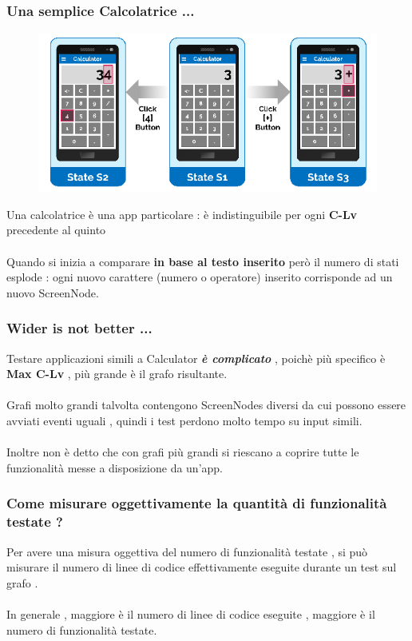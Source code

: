 \documentclass[12pt]{beamer}
\begin{document}

\begin{frame}

\frametitle{Una semplice Calcolatrice ...}
\begin{figure}
\includegraphics[width=0.8\linewidth]{images/calculator.png}
\end{figure}
Una calcolatrice \`e una app particolare : \`e indistinguibile per ogni \textbf{C-Lv} precedente al quinto
\\~\\
Quando si inizia a comparare \textbf{in base al testo inserito} per\`o il numero di stati esplode : ogni nuovo carattere (numero o operatore) inserito corrisponde ad un nuovo ScreenNode.
\end{frame} 


\begin{frame}
\frametitle{Wider is not better ...}
Testare applicazioni simili a Calculator \textbf{\textit{ \`e complicato}} , poich\`e pi\`u specifico \`e \textbf{Max C-Lv} , pi\`u grande \`e il grafo risultante.
\\~\\

Grafi molto grandi talvolta contengono ScreenNodes diversi da cui possono essere avviati eventi uguali , quindi i test perdono molto tempo su input simili.
\\~\\

Inoltre non \`e detto che con grafi pi\`u grandi si riescano a coprire tutte le funzionalit\`a messe a disposizione da un'app. 
\end{frame}


\begin{frame}
\frametitle{Come misurare oggettivamente la quantit\`a di funzionalità testate ?}
Per avere una misura oggettiva del numero di funzionalit\`a testate , si pu\`o misurare il numero di linee di codice effettivamente eseguite durante un test sul grafo .
\\~\\

In generale , maggiore \`e il numero di linee di codice eseguite , maggiore \`e il numero di funzionalit\`a testate.
\end{frame}
\end{document}
